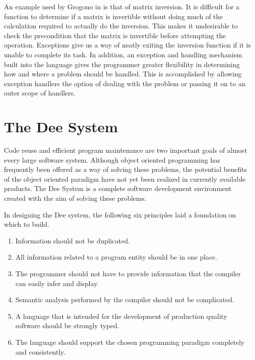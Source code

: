 An example used by Grogono in \cite{Grogono90} is that of matrix
inversion.  It is difficult for a function to determine if a matrix is
invertible without doing much of the calculation required to actually
do the inversion.  This makes it undesirable to check the precondition
that the matrix is invertible before attempting the operation.
Exceptions give us a way of neatly exiting the inversion function if
it is unable to complete its task.  In addition, an exception and
handling mechanism built into the language gives the programmer
greater flexibility in determining how and where a problem should be
handled.  This is accomplished by allowing exception handlers the
option of dealing with the problem or passing it on to an outer scope
of handlers.




\section{The Dee System}

Code reuse and efficient program maintenance are two important goals
of almost every large software system.  Although object oriented
programming has frequently been offered as a way of solving these
problems, the potential benefits of the object oriented paradigm have
not yet been realized in currently available products. The Dee System
is a complete software development environment created with the aim of
solving these problems.

In designing the Dee system, the following six principles laid a
foundation on which to build.

\begin{enumerate}

\item Information should not be duplicated.

\item All information related to a program entity should be in one
place.

\item The programmer should not have to provide information that the
compiler can easily infer and display.

\item Semantic analysis performed by the compiler should not be
complicated.  

\item A language that is intended for the development of production
quality software should be strongly typed.

\item The language should support the chosen programming paradigm
completely and consistently.

\end{enumerate}

